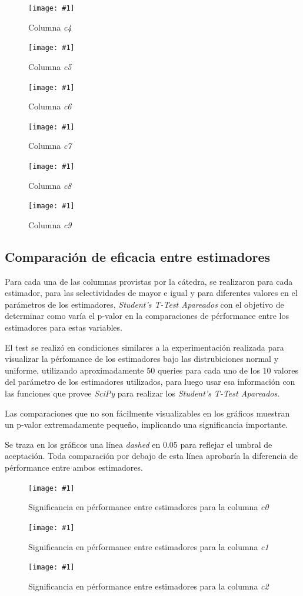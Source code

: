 \documentclass[a4paper, 10pt, twoside]{article}
\newcommand{\grafico}[3]{
  \begin{figure}[H]
    \texttt{[image: \#1]}
    \caption{#2}
    \label{#3}
  \end{figure}
}
\begin{document}
\grafico{dataset-c4}
        {Columna \emph{c4}}
        {dataset-columna-c4}

\grafico{dataset-c5}
        {Columna \emph{c5}}
        {dataset-columna-c5}

\grafico{dataset-c6}
        {Columna \emph{c6}}
        {dataset-columna-c6}

\grafico{dataset-c7}
        {Columna \emph{c7}}
        {dataset-columna-c7}

\grafico{dataset-c8}
        {Columna \emph{c8}}
        {dataset-columna-c8}

\grafico{dataset-c9}
        {Columna \emph{c9}}
        {dataset-columna-c9}


\subsection{Comparación de eficacia entre estimadores}
Para cada una de las columnas provistas por la cátedra, se realizaron para cada estimador, para las selectividades de mayor e igual y para diferentes valores en el parámetros de los estimadores, \textit{Student’s T-Test Apareados} con el objetivo de determinar como varía el p-valor en la comparaciones de pérformance entre los estimadores para estas variables.

El test se realizó en condiciones similares a la experimentación realizada para visualizar la pérfomance de los estimadores bajo las distrubiciones normal y uniforme, utilizando aproximadamente 50 queries para cada uno de los 10 valores del parámetro de los estimadores utilizados, para luego usar esa información con las funciones que provee \textit{SciPy} para realizar los \textit{Student’s T-Test Apareados}.

Las comparaciones que no son fácilmente visualizables en los gráficos muestran un p-valor extremadamente pequeño, implicando una significancia importante.

Se traza en los gráficos una línea \textit{dashed} en 0.05 para reflejar el umbral de aceptación. Toda comparación por debajo de esta línea aprobaría la diferencia de pérformance entre ambos estimadores.

\grafico{plot-significance-c0}
        {Significancia en pérformance entre estimadores para la columna \emph{c0}}
        {student-columna-c0}

\grafico{plot-significance-c1}
        {Significancia en pérformance entre estimadores para la columna \emph{c1}}
        {student-columna-c1}

\grafico{plot-significance-c2}
        {Significancia en pérformance entre estimadores para la columna \emph{c2}}
        {student-columna-c2}
\end{document}
